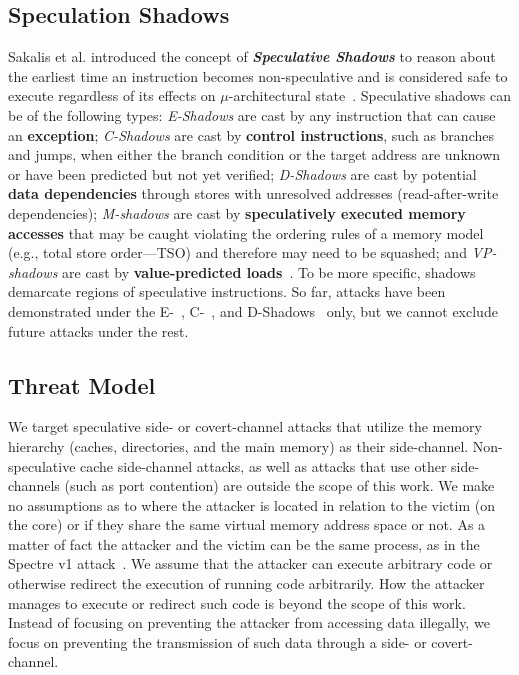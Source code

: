 \subsection{Speculation Shadows} 
Sakalis et al. introduced the concept of \textbf{\emph{Speculative Shadows}} to reason about the earliest time an instruction becomes non-speculative and is considered safe to execute regardless of its effects on $\mu$-architectural state~\cite{sakalis+:CF2019ghost,sakalis+:ISCA2019vp}.
Speculative shadows can be of the following types: \emph{E-Shadows} are cast by any instruction that can cause an \textbf{exception}; 
\emph{C-Shadows} are cast by \textbf{control instructions}, such as branches and jumps, when either the branch condition or the target address are unknown or have been predicted but not yet verified; \emph{D-Shadows} are cast by potential \textbf{data dependencies} through stores with unresolved addresses (read-after-write dependencies); \emph{M-shadows} are cast by \textbf{speculatively executed memory accesses} that may be caught violating the ordering rules of a memory model (e.g., total store order---TSO) and therefore may need to be squashed; and \emph{VP-shadows} are cast by \textbf{value-predicted loads}~\cite{sakalis+:ISCA2019vp}. To be more specific, shadows demarcate regions of speculative instructions. So far, attacks have been demonstrated under the E-~\cite{}, C-~\cite{}, and D-Shadows~\cite{} only, but we cannot exclude future attacks under the rest.

\subsection{Threat Model}
\label{sec:threat}

We target speculative side- or covert-channel attacks that utilize the memory hierarchy (caches, directories, and the main memory) as their side-channel. Non-speculative cache side-channel attacks, as well as attacks that use other side-channels (such as port contention) are outside the scope of this work.
We make no assumptions as to where the attacker is located in relation to the victim (on the core) or if they share the same virtual memory address space or not.
As a matter of fact the attacker and the victim can be the same process, as in the Spectre v1 attack~\cite{}.
We assume that the attacker can execute arbitrary code or otherwise redirect the execution of running code arbitrarily.
How the attacker manages to execute or redirect such code is beyond the scope of this work. Instead of focusing on preventing the attacker from accessing data illegally, we focus on preventing the transmission of such data through a side- or covert-channel.

